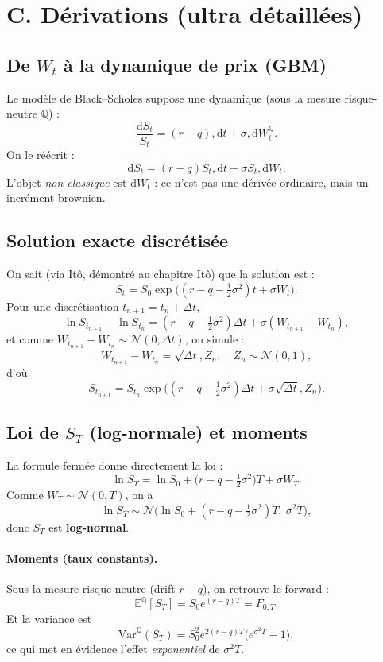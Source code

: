 \documentclass[11pt,a4paper]{report}
\theoremstyle{definition}
\theoremstyle{plain}
\theoremstyle{remark}
\newcommand{\dd}{\mathrm{d}}
\newcommand{\E}{\mathbb{E}}
\newcommand{\Var}{\mathrm{Var}}
\newcommand{\1}{\mathbf{1}}
\newcommand{\Normal}{\mathcal{N}}
\newcommand{\Qmeas}{\mathbb{Q}}
\begin{document}


\section{C. Dérivations (ultra détaillées)}
\subsection*{De $W_t$ à la dynamique de prix (GBM)}
Le modèle de Black--Scholes suppose une dynamique (sous la mesure risque-neutre $\Qmeas$) :
\[
\frac{\dd S_t}{S_t}=(r-q),\dd t + \sigma,\dd W_t^{\Qmeas}.
\]
On le réécrit :
\[
\dd S_t = (r-q)S_t,\dd t + \sigma S_t,\dd W_t.
\]
L'objet \emph{non classique} est $\dd W_t$ : ce n'est pas une dérivée ordinaire, mais un incrément brownien.

\subsection*{Solution exacte discrétisée}
On sait (via Itô, démontré au chapitre Itô) que la solution est :
\[
S_t = S_0\exp\Big((r-q-\tfrac12\sigma^2)t+\sigma W_t\Big).
\]
Pour une discrétisation $t_{n+1}=t_n+\Delta t$,
\[
\ln S_{t_{n+1}}-\ln S_{t_n}=(r-q-\tfrac12\sigma^2)\Delta t+\sigma (W_{t_{n+1}}-W_{t_n}),
\]
et comme $W_{t_{n+1}}-W_{t_n}\sim\Normal(0,\Delta t)$, on simule :
\[
W_{t_{n+1}}-W_{t_n}=\sqrt{\Delta t},Z_n,\quad Z_n\sim\Normal(0,1),
\]
d'où
\[
S_{t_{n+1}} = S_{t_n}\exp\Big((r-q-\tfrac12\sigma^2)\Delta t+\sigma\sqrt{\Delta t},Z_n\Big).
\]

\subsection*{Loi de $S_T$ (log-normale) et moments}
La formule fermée donne directement la loi :
\[
\ln S_T = \ln S_0 + \Big(r-q-\tfrac12\sigma^2\Big)T + \sigma W_T.
\]
Comme $W_T\sim\Normal(0,T)$, on a
\[
\ln S_T \sim \Normal\Big(\ln S_0 + (r-q-\tfrac12\sigma^2)T,\ \sigma^2 T\Big),
\]
donc $S_T$ est \textbf{log-normal}.

\paragraph{Moments (taux constants).}
Sous la mesure risque-neutre (drift $r-q$), on retrouve le forward :
\[
\E^{\Qmeas}[S_T]=S_0e^{(r-q)T}=F_{0,T}.
\]
Et la variance est
\[
\Var^{\Qmeas}(S_T)=S_0^2e^{2(r-q)T}\big(e^{\sigma^2T}-1\big),
\]
ce qui met en évidence l'effet \emph{exponentiel} de $\sigma^2T$.
\end{document}
